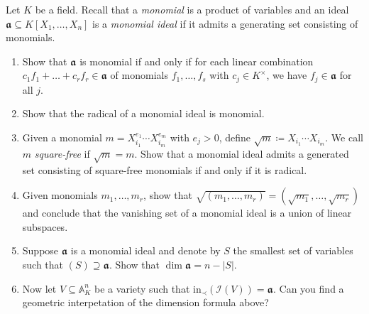 \documentclass{exercises}
\begin{document}
\begin{exercise} 
  Let $K$ be a field.
  Recall that a \emph{monomial} is a product of variables and an ideal $𝖆 ⊆ K[X_1,\dots,X_n]$ is a \emph{monomial ideal} if it admits a generating set consisting of monomials.
  \begin{enumerate}
    \item Show that $𝖆$ is monomial if and only if for each linear combination $c_1f_1 + \dots + c_rf_r ∈ 𝖆$ of monomials $f_1,\dots,f_s$ with $c_j ∈ K^×$, we have $f_j ∈ 𝖆$ for all $j$.
    \item Show that the radical of a monomial ideal is monomial.
    \item Given a monomial $m=X_{i_1}^{e_1}\cdots X_{i_m}^{e_m}$ with $e_j > 0$, define $\sqrt{m} \coloneqq X_{i_1}\cdots X_{i_m}$.
      We call $m$ \emph{square-free} if $\sqrt{m}=m$.
      Show that a monomial ideal admits a generated set consisting of square-free monomials if and only if it is radical.
    \item Given monomials $m_1,\dots,m_r$, show that $\sqrt{(m_1,\dots,m_r)} = (\sqrt{m_1},\dots,\sqrt{m_r})$ and conclude that the vanishing set of a monomial ideal is a union of linear subspaces.
    \item Suppose $𝖆$ is a monomial ideal and denote by $S$ the smallest set of variables such that $(S)⊇𝖆$.
      Show that $\dim 𝖆 = n - |S|$.
    \item Now let $V⊆𝔸^n_K$ be a variety such that $\mathrm{in}_\prec(ℐ(V))=𝖆$.
      Can you find a geometric interpetation of the dimension formula above?
  \end{enumerate}
\end{exercise}
\end{document}
